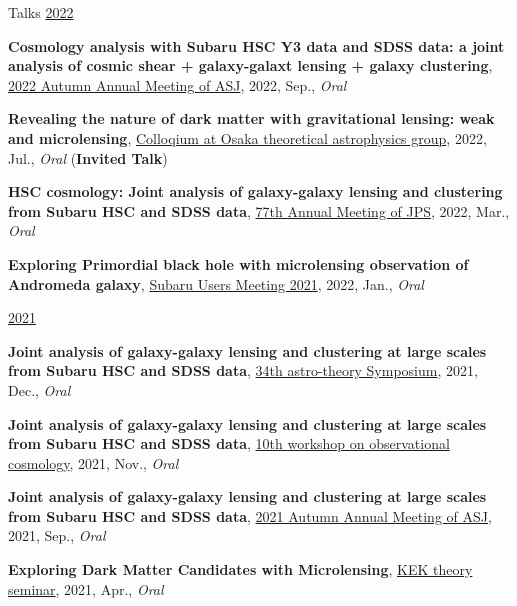 \begin{rSection}{Talks}
\underline{2022}
\begin{etaremune}
\setcounter{enumi}{24}
\item \textbf{Cosmology analysis with Subaru HSC Y3 data and SDSS data: a joint analysis of cosmic shear + galaxy-galaxt lensing + galaxy clustering}, \href{https://www.asj.or.jp/nenkai/archive/2022b/pdf/U15a.pdf}{2022 Autumn Annual Meeting of ASJ}, 2022, Sep., \textit{Oral}
\item \textbf{Revealing the nature of dark matter with gravitational lensing: weak and microlensing}, \href{http://astro-osaka.jp/OUTAP/colloquium-abstracts.html#sugiyama}{Colloqium at Osaka theoretical astrophysics group}, 2022, Jul., \textit{Oral} (\textbf{Invited Talk})
\item \textbf{HSC cosmology: Joint analysis of galaxy-galaxy lensing and clustering from Subaru HSC and SDSS data}, \href{https://www.jps.or.jp/activities/meetings/annual/annual-index.php}{77th Annual Meeting of JPS}, 2022, Mar., \textit{Oral}
\item \textbf{Exploring Primordial black hole with microlensing observation of Andromeda galaxy}, \href{https://subarutelescope.org/Science/SubaruUM/SubaruUM2021/}{Subaru Users Meeting 2021}, 2022, Jan., \textit{Oral}
\end{etaremune}

\underline{2021}
\begin{etaremune}
\setcounter{enumi}{20}
\item \textbf{Joint analysis of galaxy-galaxy lensing and clustering at large scales from Subaru HSC and SDSS data}, \href{https://sites.google.com/view/rironkon2021/}{34th astro-theory Symposium}, 2021, Dec., \textit{Oral}
\item \textbf{Joint analysis of galaxy-galaxy lensing and clustering at large scales from Subaru HSC and SDSS data}, \href{https://sites.google.com/view/obscosmws2021main}{10th workshop on observational cosmology}, 2021, Nov., \textit{Oral}
\item \textbf{Joint analysis of galaxy-galaxy lensing and clustering at large scales from Subaru HSC and SDSS data}, \href{https://www.asj.or.jp/nenkai/archive/2021b/pdf/U05a.pdf}{2021 Autumn Annual Meeting of ASJ}, 2021, Sep., \textit{Oral}
\item \textbf{Exploring Dark Matter Candidates with Microlensing}, \href{https://www.kek.jp/ja/conference/20210407-3/}{KEK theory seminar}, 2021, Apr., \textit{Oral}
\end{etaremune}


\end{rSection}
